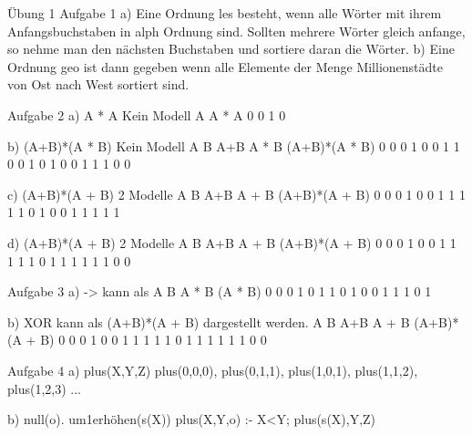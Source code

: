 Übung 1 
Aufgabe 1
a) Eine Ordnung les besteht, wenn alle Wörter  mit ihrem Anfangsbuchstaben in alph Ordnung sind.
   Sollten mehrere Wörter gleich anfange, so nehme man den nächsten Buchstaben und sortiere daran 
   die Wörter.
b) Eine Ordnung geo ist dann gegeben wenn alle Elemente der Menge Millionenstädte von Ost nach 
   West sortiert sind.
 
  
Aufgabe 2
a) A * \lnot A
Kein Modell
A	A * \lnot A
0	0
1	0

b) (A+B)*(\lnot A * \lnot B)
Kein Modell
A	B	A+B	\lnot A * \lnot B	(A+B)*(\lnot A * \lnot B)
0	0	0	1	0
0	1	1	0	0
1	0	1	0	0
1	1	1	0	0

c) (A+B)*(\lnot A + B)
2 Modelle
A	B	A+B	\lnot A + B	(A+B)*(\lnot A + B)
0	0	0	1	0
0	1	1	1	1
1	0	1	0	0
1	1	1	1	1

d) (A+B)*(\lnot A + \lnot B)
2 Modelle
A	B	A+B	\lnot A + \lnot B	(A+B)*(\lnot A + \lnot B)
0	0	0	1	0
0	1	1	1	1
1	0	1	1	1
1	1	1	0	0


Aufgabe 3
a) -> kann als
A	B	\lnot A * B	\lnot (\lnot A * B)
0	0	0	1
0	1	1	0
1	0	0	1
1	1	0	1

b) XOR kann als (A+B)*(\lnot A + \lnot B) dargestellt werden.
A	B	A+B	\lnot A + \lnot B	(A+B)*(\lnot A + \lnot B)
0	0	0	1	0
0	1	1	1	1
1	0	1	1	1
1	1	1	0	0

Aufgabe 4
a) plus(X,Y,Z)
	plus(0,0,0), plus(0,1,1), plus(1,0,1), plus(1,1,2), plus(1,2,3) ...
	
b) null(o).
   um1erhöhen(s(X))
	plus(X,Y,o) :- X<Y; plus(s(X),Y,Z)